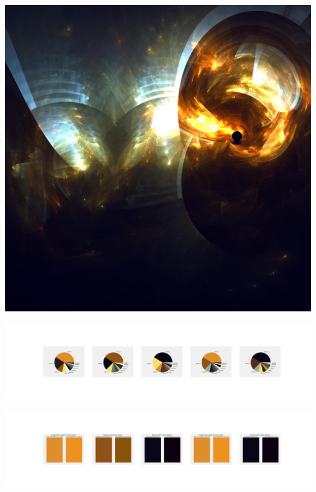 \documentclass[11pt]{article}
\begin{document}
\begin{landscape}
    \begin{center}
    \includegraphics[width=\textwidth]{./nbimg/file (222).jpg}
    \end{center}

    \begin{center}
    \includegraphics[width=250mm]{./nbimg/pie-137.jpg}
    \end{center}

    \begin{center}
    \includegraphics[width=250mm]{./nbimg/peak-137.jpg}
    \end{center}
    


\end{landscape}
\end{document}
